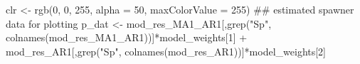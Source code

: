 \documentclass[
  11pt,
]{article}
\newenvironment{Shaded}{}{}
\newcommand{\CommentTok}[1]{\textcolor[rgb]{0.00,0.50,0.00}{#1}}
\newcommand{\DataTypeTok}[1]{#1}
\newcommand{\DecValTok}[1]{#1}
\newcommand{\KeywordTok}[1]{\textcolor[rgb]{0.00,0.00,1.00}{#1}}
\newcommand{\NormalTok}[1]{#1}
\newcommand{\OperatorTok}[1]{#1}
\newcommand{\StringTok}[1]{\textcolor[rgb]{0.00,0.50,0.50}{#1}}
\begin{document}
\begin{Shaded}
\begin{Highlighting}[]
\NormalTok{clr <-}\StringTok{ }\KeywordTok{rgb}\NormalTok{(}\DecValTok{0}\NormalTok{, }\DecValTok{0}\NormalTok{, }\DecValTok{255}\NormalTok{, }\DataTypeTok{alpha =} \DecValTok{50}\NormalTok{, }\DataTypeTok{maxColorValue =} \DecValTok{255}\NormalTok{)}
\CommentTok{## estimated spawner data for plotting}
\NormalTok{p_dat <-}\StringTok{ }\NormalTok{mod_res_MA1_AR1[,}\KeywordTok{grep}\NormalTok{(}\StringTok{"Sp"}\NormalTok{, }\KeywordTok{colnames}\NormalTok{(mod_res_MA1_AR1))]}\OperatorTok{*}\NormalTok{model_weights[}\DecValTok{1}\NormalTok{] }\OperatorTok{+}\StringTok{ }\NormalTok{mod_res_AR1[,}\KeywordTok{grep}\NormalTok{(}\StringTok{"Sp"}\NormalTok{, }\KeywordTok{colnames}\NormalTok{(mod_res_AR1))]}\OperatorTok{*}\NormalTok{model_weights[}\DecValTok{2}\NormalTok{]  }


\end{Highlighting}
\end{Shaded}
\end{document}
